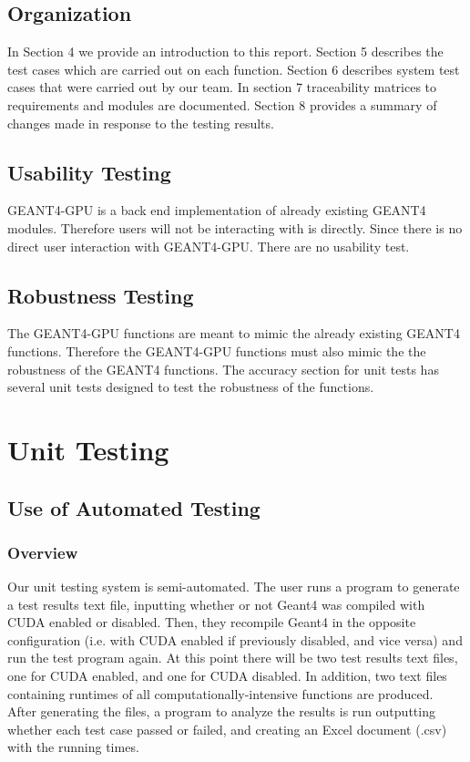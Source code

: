 \documentclass[12pt]{article}
\begin{document}
\subsection{Organization}
In Section 4 we provide an introduction to this report. Section 5 describes the test cases which are carried out on each function. Section 6 describes system test cases that were carried out by our team. In section 7 traceability matrices to requirements and modules are documented. Section 8 provides a summary of changes made in response to the testing results.
\subsection{Usability Testing}
GEANT4-GPU is a back end implementation of already existing GEANT4 modules. Therefore users will not be interacting with is directly. Since there is no direct user interaction with GEANT4-GPU. There are no usability test. 
\subsection{Robustness Testing}
The GEANT4-GPU functions are meant to mimic the already existing GEANT4 functions. Therefore the GEANT4-GPU functions must also mimic the the robustness of the GEANT4 functions. The accuracy section for unit tests has several unit tests designed to test the robustness of the functions. 

\newpage
\section{Unit Testing}
\subsection{Use of Automated Testing}
\subsubsection{Overview}
Our unit testing system is semi-automated. The user runs a program to generate a test results text file, inputting whether or not Geant4 was compiled with CUDA enabled or disabled. Then, they recompile Geant4 in the opposite configuration (i.e. with CUDA enabled if previously disabled, and vice versa) and run the test program again. At this point there will be two test results text files, one for CUDA enabled, and one for CUDA disabled. In addition, two text files containing runtimes of all computationally-intensive functions are produced. After generating the files, a program to analyze the results is run outputting whether each test case passed or failed, and creating an Excel document (.csv) with the running times.
\end{document}

